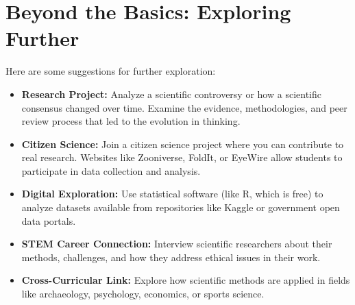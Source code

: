 \section{Beyond the Basics: Exploring Further}

 Here are some suggestions for further exploration:

\begin{itemize}
    \item \textbf{Research Project:} Analyze a scientific controversy or how a scientific consensus changed over time. Examine the evidence, methodologies, and peer review process that led to the evolution in thinking.
    
    \item \textbf{Citizen Science:} Join a citizen science project where you can contribute to real research. Websites like Zooniverse, FoldIt, or EyeWire allow students to participate in data collection and analysis.
    
    \item \textbf{Digital Exploration:} Use statistical software (like R, which is free) to analyze datasets available from repositories like Kaggle or government open data portals.
    
    \item \textbf{STEM Career Connection:} Interview scientific researchers about their methods, challenges, and how they address ethical issues in their work.
    
    \item \textbf{Cross-Curricular Link:} Explore how scientific methods are applied in fields like archaeology, psychology, economics, or sports science.
\end{itemize}